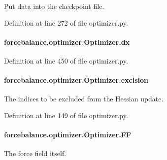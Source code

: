 Put data into the checkpoint file. 



Definition at line 272 of file optimizer.\-py.

\hypertarget{classforcebalance_1_1optimizer_1_1Optimizer_aaa9b39385a4d067aec12a595da09cc16}{
\paragraph[{dx}]{\setlength{\rightskip}{0pt plus 5cm}forcebalance.\-optimizer.\-Optimizer.\-dx}}\label{classforcebalance_1_1optimizer_1_1Optimizer_aaa9b39385a4d067aec12a595da09cc16}


Definition at line 450 of file optimizer.\-py.

\hypertarget{classforcebalance_1_1optimizer_1_1Optimizer_a1040c03a6361d782db8bd6a273d445e5}{
\paragraph[{excision}]{\setlength{\rightskip}{0pt plus 5cm}forcebalance.\-optimizer.\-Optimizer.\-excision}}\label{classforcebalance_1_1optimizer_1_1Optimizer_a1040c03a6361d782db8bd6a273d445e5}


The indices to be excluded from the Hessian update. 



Definition at line 149 of file optimizer.\-py.

\hypertarget{classforcebalance_1_1optimizer_1_1Optimizer_a873d6c3dfc5351d162613b596850af75}{
\paragraph[{F\-F}]{\setlength{\rightskip}{0pt plus 5cm}forcebalance.\-optimizer.\-Optimizer.\-F\-F}}\label{classforcebalance_1_1optimizer_1_1Optimizer_a873d6c3dfc5351d162613b596850af75}


The force field itself. 



